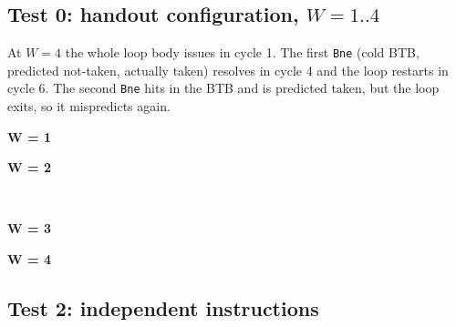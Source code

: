 \documentclass[11pt]{article}
\begin{document}
\subsection{Test 0: handout configuration, \texorpdfstring{$W=1..4$}{W=1..4}}
At $W{=}4$ the whole loop body issues in cycle 1. The first \texttt{Bne} (cold BTB, predicted
not-taken, actually taken) resolves in cycle 4 and the loop restarts in cycle 6. The second
\texttt{Bne} hits in the BTB and is predicted taken, but the loop exits, so it mispredicts again.
\begin{table}[H]\centering\scriptsize
\begin{minipage}{0.48\textwidth}\centering \textbf{W = 1}\\[2pt]\end{minipage}\hfill
\begin{minipage}{0.48\textwidth}\centering \textbf{W = 2}\\[2pt]\end{minipage}\\[8pt]
\begin{minipage}{0.48\textwidth}\centering \textbf{W = 3}\\[2pt]\end{minipage}\hfill
\begin{minipage}{0.48\textwidth}\centering \textbf{W = 4}\\[2pt]\end{minipage}
\caption{\texttt{test0} instruction status (1 CDB). EX/MEM show first--last cycle; ``--'' = stage not used.}
\end{table}

\subsection{Test 2: independent instructions}
\begin{table}[H]\centering\small

\caption{\texttt{test2}, ISSUE (I) and COMMIT (C) cycle at each width with CDB width $=W$. Exactly $W$ instructions issue per cycle.}
\end{table}
\begin{table}[H]\centering\small

\caption{\texttt{test2} with a single CDB: issue still reaches $W$ per cycle, but write-back serializes, so commits spread out.}
\end{table}
\begin{table}[H]\centering\scriptsize

\caption{\texttt{test2}, full status at $W{=}4$, 4 CDBs. Up to 4 operations start EX per cycle on the two integer adders and the pipelined FP units, and 4 instructions commit per cycle.}
\end{table}
\end{document}
